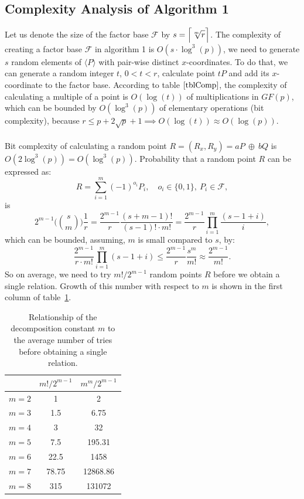 \documentclass[thesis=M,english]{FITthesis}[2012/10/20]
\theoremstyle{remark}
\theoremstyle{definition}
\begin{document}
\subsection{Complexity Analysis of Algorithm 1}
Let us denote the size of the factor base $\mathcal{F}$ by $s = \mathlarger{\Big\lceil \sqrt[m]{r} \Big\rceil}$. The complexity of creating a factor base $\mathcal{F}$ in algorithm 1 is $O(s\cdot \log^3(p))$, we need to generate $s$ random elements of $\langle P \rangle$ with pair-wise distinct $x$-coordinates. To do that, we can generate a random integer $t$, $0 < t < r$, calculate point $tP$ and add its $x$-coordinate to the factor base. According to table $\ref{tblComp}$, the complexity of calculating a multiple of a  point is $O(\log(t))$ of multiplications in $GF(p)$, which can be bounded by $O(\log^3(p))$ of elementary operations (bit complexity), because $r \leq p + 2\sqrt{p} + 1 \implies O(\log(t)) \approx O(\log(p)).$ \\
\\
\noindent Bit complexity of calculating a random point $R = (R_x, R_y) = aP\ \oplus\ bQ$ is $O(2\log^3(p)) = O(\log^3(p))$. Probability that a random point $R$ can be expressed as:
$$
R = \sum_{i=1}^m(-1)^{o_i}P_i,\quad o_i \in \{0,1\},\ P_i \in \mathcal{F},
$$
is 
$$
2^{m-1}\Bigg(\binom{s}{m}\Bigg)\frac{1}{r} = \frac{2^{m-1}}{r}\frac{(s + m -1)!}{(s-1)!\cdot m!}=\frac{2^{m-1}}{r} \prod_{i=1}^m\frac{(s-1+i)}{i},
$$
which can be bounded, assuming, $m$ is small compared to $s$, by:
$$
\frac{2^{m-1}}{r\cdot m!} \prod_{i=1}^m(s - 1+i) \leq \frac{2^{m-1}}{r}\frac{s^m}{m!} \approx \frac{2^{m-1}}{m!}.
$$
So on average, we need to try $m! / 2^{m-1}$ random points $R$ before we obtain a single relation. Growth of this number with respect to $m$ is shown in the first column of table~\ref{growth}.
\begin{table}[H]
\centering
\begin{tabular}{ |c||c|c| } 
 \hline
 & $m!/2^{m-1}$ & $m^m/2^{m-1}$ \\ 
 \hline
 \hline
$m=2$ & 1& 2\\  \hline
$m=3$ & 1.5 & 6.75\\  \hline
$m=4$ &  3 & 32\\  \hline
$m=5$& 7.5 & 195.31\\ \hline
$m=6$& 22.5 & 1458 \\ \hline
$m=7$& 78.75 & 12868.86  \\ \hline
$m=8$& 315 & 131072  \\ \hline
\end{tabular}
\caption[Decomposition constant $m$ and the average number of tries]{Relationship of the decomposition constant $m$ to the average number of tries before obtaining a single relation.}
\label{growth}
\end{table}
\end{document}
